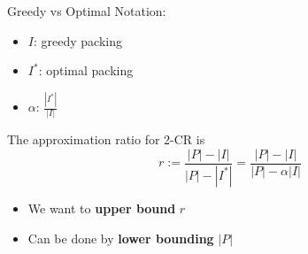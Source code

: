 \begin{frame}{Greedy vs Optimal}
Notation:
\begin{itemize}
\pause\item
\alert{$I$}: greedy packing

\pause\item
\alert{$I^*$}: optimal packing

\pause\item
\alert{$\alpha$}: $\frac{|I^*|}{|I|}$ 

\end{itemize}

\pause
\begin{observation}
The approximation ratio for 2-CR is
$$ r := \frac{|P| - |I|}{|P| - |I^*|} = \frac{|P| - |I|}{|P| - \alpha|I|}$$
\end{observation}

\begin{itemize}
\pause\item
We want to \textbf{upper bound} $r$
\pause\item
Can be done by \textbf{lower bounding} $|P|$
\end{itemize}


\end{frame}